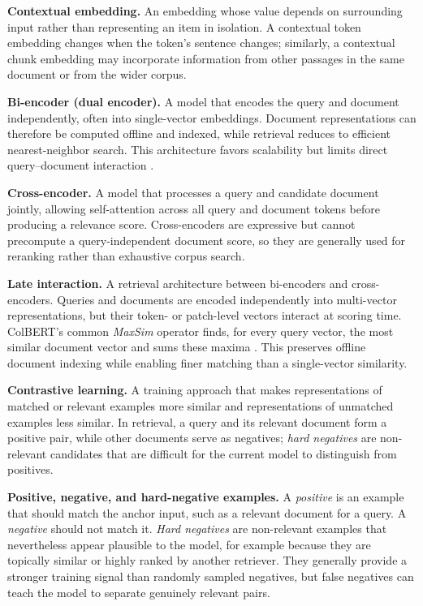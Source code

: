 \noindent\textbf{Contextual embedding.}
An embedding whose value depends on surrounding input rather than representing
an item in isolation. A contextual token embedding changes when the token's
sentence changes; similarly, a contextual chunk embedding may incorporate
information from other passages in the same document or from the wider corpus.

\noindent\textbf{Bi-encoder (dual encoder).}
A model that encodes the query and document independently, often into
single-vector embeddings. Document representations can therefore be computed
offline and indexed, while retrieval reduces to efficient nearest-neighbor
search. This architecture favors scalability but limits direct query--document
interaction .

\noindent\textbf{Cross-encoder.}
A model that processes a query and candidate document jointly, allowing
self-attention across all query and document tokens before producing a relevance
score. Cross-encoders are expressive but cannot precompute a query-independent
document score, so they are generally used for reranking rather than exhaustive
corpus search.

\noindent\textbf{Late interaction.}
A retrieval architecture between bi-encoders and cross-encoders. Queries and
documents are encoded independently into multi-vector representations, but
their token- or patch-level vectors interact at scoring time. ColBERT's common
\emph{MaxSim} operator finds, for every query vector, the most similar document
vector and sums these maxima . This preserves
offline document indexing while enabling finer matching than a single-vector
similarity.

\noindent\textbf{Contrastive learning.}
A training approach that makes representations of matched or relevant examples
more similar and representations of unmatched examples less similar. In
retrieval, a query and its relevant document form a positive pair, while other
documents serve as negatives; \emph{hard negatives} are non-relevant candidates
that are difficult for the current model to distinguish from positives.

\noindent\textbf{Positive, negative, and hard-negative examples.}
A \emph{positive} is an example that should match the anchor input, such as a
relevant document for a query. A \emph{negative} should not match it.
\emph{Hard negatives} are non-relevant examples that nevertheless appear
plausible to the model, for example because they are topically similar or
highly ranked by another retriever. They generally provide a stronger training
signal than randomly sampled negatives, but false negatives can teach the model
to separate genuinely relevant pairs.

